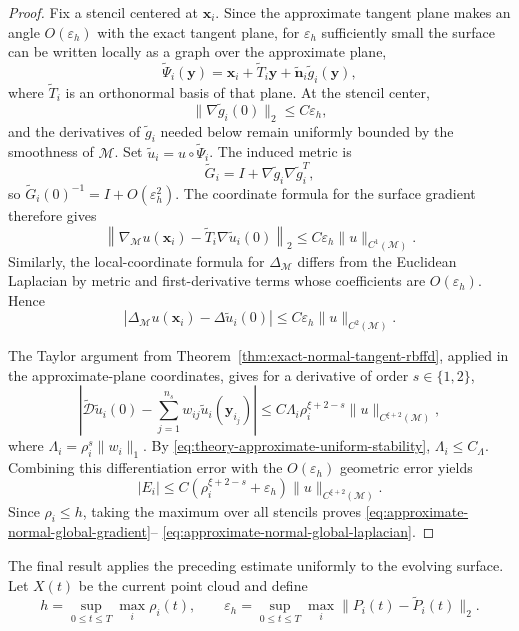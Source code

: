 \documentclass[a4paper,fleqn]{cas-sc}
\begin{document}
\begin{proof}
Fix a stencil centered at \(\bm x_i\).  Since the approximate tangent plane
makes an angle \(O(\varepsilon_h)\) with the exact tangent plane, for
\(\varepsilon_h\) sufficiently small the surface can be written locally as a
graph over the approximate plane,
\[
  \widetilde\Psi_i(\bm y)
  =\bm x_i+\widetilde T_i\bm y
  +\widetilde{\bm n}_i\widetilde g_i(\bm y),
\]
where \(\widetilde T_i\) is an orthonormal basis of that plane.  At the stencil
center,
\[
  \|\nabla\widetilde g_i(0)\|_2\leq C\varepsilon_h,
\]
and the derivatives of \(\widetilde g_i\) needed below remain uniformly
bounded by the smoothness of \(\mathcal M\). Set \(\widetilde u_i=u\circ\widetilde\Psi_i\).  The induced metric is
\[
  \widetilde G_i
  =I+\nabla\widetilde g_i\nabla\widetilde g_i^T,
\]
so \(\widetilde G_i(0)^{-1}=I+O(\varepsilon_h^2)\).  The coordinate formula for
the surface gradient therefore gives
\[
  \left\|
    \nabla_{\mathcal M}u(\bm x_i)
    -\widetilde T_i\nabla\widetilde u_i(0)
  \right\|_2
  \leq C\varepsilon_h\|u\|_{C^1(\mathcal M)}.
\]
Similarly, the local-coordinate formula for \(\Delta_{\mathcal M}\) differs
from the Euclidean Laplacian by metric and first-derivative terms whose
coefficients are \(O(\varepsilon_h)\).  Hence
\[
  \left|
    \Delta_{\mathcal M}u(\bm x_i)
    -\Delta\widetilde u_i(0)
  \right|
  \leq C\varepsilon_h\|u\|_{C^2(\mathcal M)}.
\]

The Taylor argument from
Theorem~\ref{thm:exact-normal-tangent-rbffd}, applied in the approximate-plane
coordinates, gives for a derivative of order \(s\in\{1,2\}\),
\[
  \left|
    \widetilde{\mathcal D}\widetilde u_i(0)
    -\sum_{j=1}^{n_s}w_{ij}\widetilde u_i(\bm y_{i_j})
  \right|
  \leq
  C\Lambda_i\rho_i^{\xi+2-s}
  \|u\|_{C^{\xi+2}(\mathcal M)},
\]
where \(\Lambda_i=\rho_i^s\|w_i\|_1\).  By
\eqref{eq:theory-approximate-uniform-stability},
\(\Lambda_i\leq C_\Lambda\).  Combining this differentiation error with the
\(O(\varepsilon_h)\) geometric error yields
\[
  |E_i|
  \leq
  C\left(\rho_i^{\xi+2-s}+\varepsilon_h\right)
  \|u\|_{C^{\xi+2}(\mathcal M)}.
\]
Since \(\rho_i\leq h\), taking the maximum over all stencils proves
\eqref{eq:approximate-normal-global-gradient}--
\eqref{eq:approximate-normal-global-laplacian}.
\end{proof}

The final result applies the preceding estimate uniformly to the evolving
surface.  Let \(X(t)\) be the current point cloud and define
\begin{equation}
  h=\sup_{0\leq t\leq T}\max_i\rho_i(t),
  \qquad
  \varepsilon_h
  =\sup_{0\leq t\leq T}\max_i
   \|P_i(t)-\widetilde P_i(t)\|_2.
  \label{eq:theory-moving-errors}
\end{equation}
\end{document}
